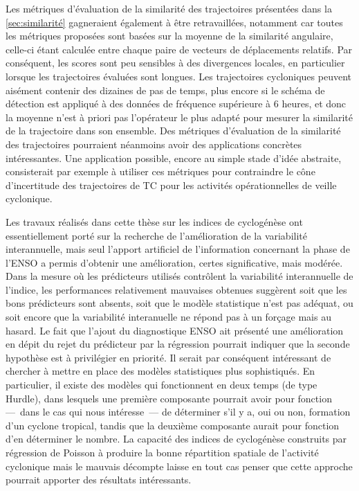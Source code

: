 \documentclass[../main.tex]{subfiles}
\begin{document}
Les métriques d'évaluation de la similarité des trajectoires présentées dans la \cref{sec:similarité} gagneraient également à être retravaillées, notamment car
toutes les métriques proposées sont basées sur la moyenne de la similarité angulaire, celle-ci étant calculée entre chaque paire de vecteurs de déplacements
relatifs. Par conséquent, les scores sont peu sensibles à des divergences locales, en particulier lorsque les trajectoires évaluées sont longues. Les
trajectoires cycloniques peuvent aisément contenir des dizaines de pas de temps, plus encore si le schéma de détection est appliqué à des données de
fréquence supérieure à \num{6} heures, et donc la moyenne n'est à priori pas l'opérateur le plus adapté pour mesurer la similarité de la trajectoire dans son
ensemble. Des métriques d'évaluation de la similarité des trajectoires pourraient néanmoins avoir des applications concrètes intéressantes. Une application
possible, encore au simple stade d'idée abstraite, consisterait par exemple à utiliser ces métriques pour contraindre le cône d'incertitude des trajectoires de
TC pour les activités opérationnelles de veille cyclonique.

Les travaux réalisés dans cette thèse sur les indices de cyclogénèse ont essentiellement porté sur la recherche de l'amélioration de la variabilité
interannuelle, mais seul l'apport artificiel de l'information concernant la phase de l'ENSO a permis d'obtenir une amélioration, certes significative, mais
modérée. Dans la mesure où les prédicteurs utilisés contrôlent la variabilité interannuelle de l'indice, les performances relativement mauvaises obtenues
suggèrent soit que les bons prédicteurs sont absents, soit que le modèle statistique n'est pas adéquat, ou soit encore que la variabilité interanuelle ne répond pas à un forçage mais au hasard. Le fait que l'ajout du diagnostique ENSO ait présenté
une amélioration en dépit du rejet du prédicteur par la régression pourrait indiquer que la seconde hypothèse est à privilégier en priorité. Il serait par
conséquent intéressant de chercher à mettre en place des modèles statistiques plus sophistiqués. En particulier, il existe des modèles qui fonctionnent en deux
temps (de type Hurdle), dans lesquels une première composante pourrait avoir pour fonction ---~dans le cas qui nous intéresse~--- de déterminer s'il y a, oui ou
non, formation d'un cyclone tropical, tandis que la deuxième composante aurait pour fonction d'en déterminer le nombre. La capacité des indices de cyclogénèse
construits par régression de Poisson à produire la bonne répartition spatiale de l'activité cyclonique mais le mauvais décompte laisse en tout cas penser que
cette approche pourrait apporter des résultats intéressants.
\end{document}
